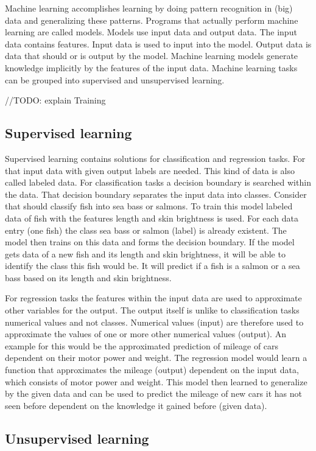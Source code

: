 \documentclass[jou,apacite]{apa6}
\begin{document}
Machine learning accomplishes learning by doing pattern recognition in (big) data and generalizing these patterns. 
Programs that actually perform machine learning are called models. Models use input data and output data. The input data contains features. Input data is used to input into the model. Output data is data that should or is output by the model. Machine learning models generate knowledge implicitly by the features of the input data. Machine learning tasks can be grouped into supervised and unsupervised learning.

//TODO: explain Training

\subsection{Supervised learning}
Supervised learning contains solutions for classification and regression tasks. For that input data with given output labels are needed. This kind of data is also called labeled data. For classification tasks a decision boundary is searched within the data. That decision boundary separates the input data into classes. Consider that should classify fish into sea bass or salmons. To train this model labeled data of fish with the features length and skin brightness is used. For each data entry (one fish) the class sea bass or salmon (label) is already existent. The model then trains on this data and forms the decision boundary. If the model gets data of a new fish and its length and skin brightness, it will be able to identify the class this fish would be. It will predict if a fish is a salmon or a sea bass based on its length and skin brightness.

For regression tasks the features within the input data are used to approximate other variables for the output. The output itself is unlike to classification tasks numerical values and not classes. Numerical values (input) are therefore used to approximate the values of one or more other numerical values (output). An example for this would be the approximated prediction of mileage of cars dependent on their motor power and weight. The regression model would learn a function that approximates the mileage (output) dependent on the input data, which consists of motor power and weight. This model then learned to generalize by the given data and can be used to predict the mileage of new cars it has not seen before dependent on the knowledge it gained before (given data).

\subsection{Unsupervised learning}
\end{document}
